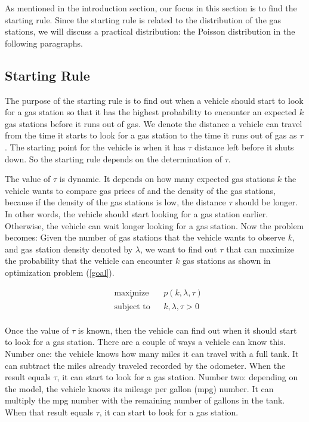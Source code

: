 \documentclass[conference]{IEEEtran}
\theoremstyle{definition}
\begin{document}
As mentioned in the introduction section, our focus in this section is to find the starting rule. Since the starting rule is related to the distribution of the gas stations, we will discuss a practical distribution: the Poisson distribution in the following paragraphs.

\subsection{Starting Rule}
The purpose of the starting rule is to find out when a vehicle should start to look for a gas station so that it has the highest probability to encounter an expected $k$ gas stations before it runs out of gas. We denote the distance a vehicle can travel from the time it starts to look for a gas station to the time it runs out of gas as $\tau$. The starting point for the vehicle is when it has $\tau$ distance left before it shuts down. So the starting rule depends on the determination of $\tau$.

The value of $\tau$ is dynamic. It depends on how many expected gas stations $k$ the vehicle wants to compare gas prices of and the density of the gas stations, because if the density of the gas stations is low, the distance $\tau$ should be longer. In other words, the vehicle should start looking for a gas station earlier. Otherwise, the vehicle can wait longer looking for a gas station. Now the problem becomes:   Given the number of gas stations that the vehicle wants to observe $k$, and gas station density denoted by $\lambda$, we want to find out $\tau$ that can maximize the probability that the vehicle can encounter $k$ gas stations as shown in optimization problem (\ref{goal}).

\begin{equation} \label{goal}
\begin{aligned}
   & \underset{\tau}{\text{maximize}}
   & &  p(k, \lambda, \tau) \\
   & \text{subject to} & & k, \lambda, \tau >0    \\
\end{aligned}
\end{equation}

Once the value of $\tau$ is known, then the vehicle can find out when it should start to look for a gas station. There are a couple of ways a vehicle can know this. Number one: the vehicle knows how many miles it can travel with a full tank. It can subtract the miles already traveled recorded by the odometer. When the result equals $\tau$, it can start to look for a gas station. Number two: depending on the model, the vehicle knows its mileage per gallon (mpg) number. It can multiply the mpg number with the remaining number of gallons in the tank. When that result equals $\tau$, it can start to look for a gas station.
\end{document}
